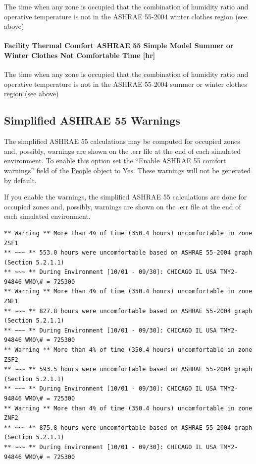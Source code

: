 The time when any zone is occupied that the combination of humidity ratio and operative temperature is not in the ASHRAE 55-2004 winter clothes region (see above)

\paragraph{Facility Thermal Comfort ASHRAE 55 Simple Model Summer or Winter Clothes Not Comfortable Time {[}hr{]}}\label{facility-thermal-comfort-ashrae-55-simple-model-summer-or-winter-clothes-not-comfortable-time-hr}

The time when any zone is occupied that the combination of humidity ratio and operative temperature is not in the ASHRAE 55-2004 summer or winter clothes region (see above)

\subsection{Simplified ASHRAE 55 Warnings}\label{simplified-ashrae-55-warnings}

The simplified ASHRAE 55 calculations may be computed for occupied zones and, possibly, warnings are shown on the .err file at the end of each simulated environment. To enable this option set the ``Enable ASHRAE 55 comfort warnings'' field of the \hyperref[people]{People} object to Yes. These warnings will not be generated by default.

If you enable the warnings, the simplified ASHRAE 55 calculations are done for occupied zones and, possibly, warnings are shown on the .err file at the end of each simulated environment.

\begin{lstlisting}
** Warning ** More than 4% of time (350.4 hours) uncomfortable in zone ZSF1
** ~~~ ** 553.0 hours were uncomfortable based on ASHRAE 55-2004 graph (Section 5.2.1.1)
** ~~~ ** During Environment [10/01 - 09/30]: CHICAGO IL USA TMY2-94846 WMO\# = 725300
** Warning ** More than 4% of time (350.4 hours) uncomfortable in zone ZNF1
** ~~~ ** 827.8 hours were uncomfortable based on ASHRAE 55-2004 graph (Section 5.2.1.1)
** ~~~ ** During Environment [10/01 - 09/30]: CHICAGO IL USA TMY2-94846 WMO\# = 725300
** Warning ** More than 4% of time (350.4 hours) uncomfortable in zone ZSF2
** ~~~ ** 593.5 hours were uncomfortable based on ASHRAE 55-2004 graph (Section 5.2.1.1)
** ~~~ ** During Environment [10/01 - 09/30]: CHICAGO IL USA TMY2-94846 WMO\# = 725300
** Warning ** More than 4% of time (350.4 hours) uncomfortable in zone ZNF2
** ~~~ ** 875.8 hours were uncomfortable based on ASHRAE 55-2004 graph (Section 5.2.1.1)
** ~~~ ** During Environment [10/01 - 09/30]: CHICAGO IL USA TMY2-94846 WMO\# = 725300
\end{lstlisting}

